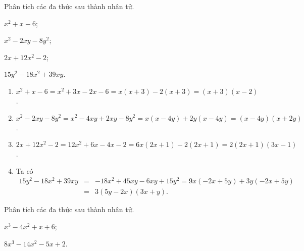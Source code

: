 \begin{vd}
Phân tích các đa thức sau thành nhân tử.
\begin{enumEX}{2}
\item $x^2+x-6$;
\item $x^2 - 2xy -8y^2$;
\item $2x + 12x^2 - 2 $;
\item $15y^2 - 18x^2 + 39xy $.
\end{enumEX}
\loigiai
{
\begin{enumerate}
\item
$x^2+x-6 = x^2+3x-2x-6 = x(x+3) - 2(x+3) = (x+3)(x-2)$.
\item $x^2 - 2xy -8y^2 = x^2 - 4xy +2xy -8y^2 = x(x-4y) + 2y(x-4y) = (x-4y)(x+2y)$.
\item  $2x + 12x^2 - 2 = 12x^2 + 6x - 4x - 2 = 6x(2x +1) - 2(2x+1) = 2(2x+1)(3x-1)$.
\item Ta có 
{\allowdisplaybreaks
\begin{eqnarray*}
15y^2 - 18x^2 + 39xy &=& -18x^2 + 45xy - 6xy + 15y^2 = 9x(-2x+5y) + 3y(-2x + 5y) \\
&=& 3(5y-2x)(3x+y).
\end{eqnarray*}}
\end{enumerate}
}
\end{vd}

\begin{vd}
Phân tích các đa thức sau thành nhân tử.
\begin{enumEX}{2}
\item $x^3-4x^2+x+6$;
\item $8x^3 - 14x^2 - 5x +2 $.
\end{enumEX}
\end{vd}


